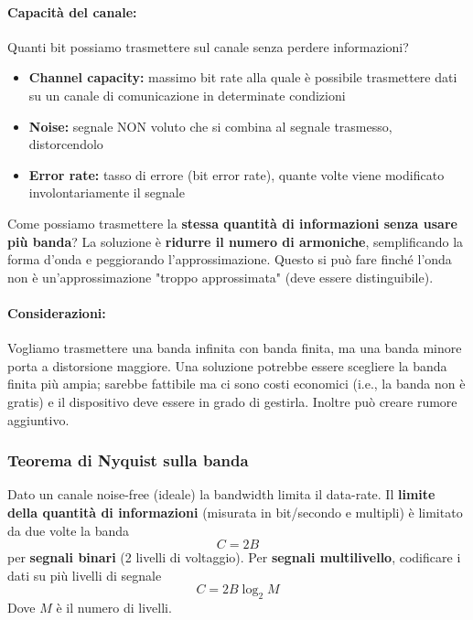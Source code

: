 \paragraph{Capacità del canale:} Quanti bit possiamo trasmettere sul canale senza perdere informazioni?
\begin{itemize}
	\item \textbf{Channel capacity:} massimo bit rate alla quale è possibile trasmettere dati su un canale di comunicazione in determinate condizioni
	\item \textbf{Noise:} segnale NON voluto che si combina al segnale trasmesso, distorcendolo
	\item \textbf{Error rate:} tasso di errore (bit error rate), quante volte viene modificato involontariamente il segnale
\end{itemize}

Come possiamo trasmettere la \textbf{stessa quantità di informazioni senza usare più banda}? La soluzione è \textbf{ridurre il numero di armoniche}, semplificando la forma d'onda e peggiorando l'approssimazione. Questo si può fare finché l'onda non è un'approssimazione "troppo approssimata" (deve essere distinguibile).\\

\paragraph{Considerazioni:} Vogliamo trasmettere una banda infinita con banda finita, ma una banda minore porta a distorsione maggiore. Una soluzione potrebbe essere scegliere la banda finita più ampia; sarebbe fattibile ma ci sono costi economici (i.e., la banda non è gratis) e il dispositivo deve essere in grado di gestirla. Inoltre può creare rumore aggiuntivo. \\

\newpage

\subsubsection{Teorema di Nyquist sulla banda}

Dato un canale noise-free (ideale) la bandwidth limita il data-rate. Il \textbf{limite della quantità di informazioni} (misurata in bit/secondo e multipli) è limitato da due volte la banda
$$ C = 2B $$
per \textbf{segnali binari} (2 livelli di voltaggio). Per \textbf{segnali multilivello}, codificare i dati su più livelli di segnale
$$ C = 2B \log_2 M $$
Dove $M$ è il numero di livelli.\\

